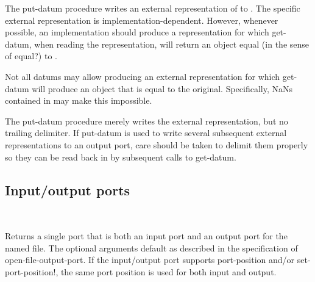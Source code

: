 \begin{entry}{%
}

  The {\cf put-datum}
procedure writes an external representation of  to
.  The specific external representation is
implementation-dependent.  However, whenever possible, an
implementation should produce a representation for which {\cf
  get-datum}, when reading the representation, will return an object
equal (in the sense of {\cf equal?}) to .

\begin{note}
  Not all datums may allow producing an external representation for which
  {\cf get-datum} will produce an object that is equal to the
  original.  Specifically, NaNs contained in  may make
  this impossible.
\end{note}

\begin{note}
  The {\cf put-datum} procedure merely writes the external
  representation, but no trailing delimiter.  If {\cf put-datum} is
  used to write several subsequent external representations to an
  output port, care should be taken to delimit them properly so they can
  be read back in by subsequent calls to {\cf get-datum}.
\end{note}
\end{entry}


\subsection{Input/output ports}\unsection

\begin{entry}{%
\\
}
   
Returns a single port that is both an input port and an
output port for the named file.
The optional arguments default as described in the specification
of {\cf open-file-output-port}.
If the input/output port supports {\cf port-position} and/or
{\cf set-port-position!}, the same port position is used
for both input and output.
\end{entry}

